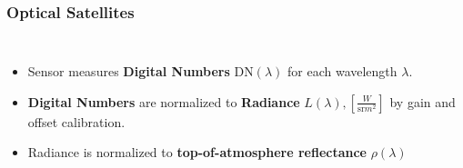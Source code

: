 \documentclass[%
  aspectratio=169,
  9pt,
  USenglish,
  titlegraphic, %
  affiliationintitlepagehead,
  affiliation,
]{beamer}
\begin{document}
%
\begin{frame}
\frametitle{Optical Satellites}
\begin{columns}
	
	
	\begin{itemize}[itemsep=.5em]
		\item<1-> Sensor measures \textbf{Digital Numbers} $\text{DN}(\lambda)$ for each wavelength $\lambda$. 
		\item<2-> \textbf{Digital Numbers} are normalized to \textbf{Radiance} 
		$L(\lambda), \left[\frac{W}{\text{sr}m^2}\right]$ by gain and offset calibration.
		\item<3-> Radiance is normalized to \textbf{top-of-atmosphere reflectance} $\rho(\lambda)$
	\end{itemize}
	
	
	
	
	
\end{columns}
\end{frame}
\end{document}
